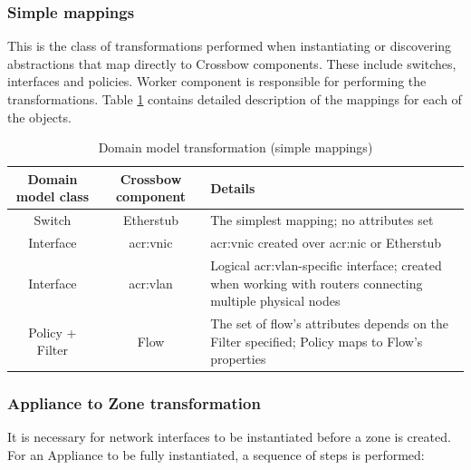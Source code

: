 \documentclass[11pt]{book}
\begin{document}
        \subsubsection{Simple mappings}

          This is the class of transformations performed when instantiating or discovering abstractions that map
          directly to Crossbow components. These include switches, interfaces and policies. Worker component is
          responsible for performing the transformations. Table \ref{tab:impl:simple-mapping} contains detailed
          description of the mappings for each of the objects.

          \begin{table}[H]
            \centering

            \begin{tabularx}{\textwidth}{|c|c|X|}
              \hline
              Domain model class & Crossbow component & \centering Details \tabularnewline
              \hline \hline
              Switch             & Etherstub          & The simplest mapping; no attributes set \\
              \hline
              Interface          & \gls{acr:vnic}     & \gls{acr:vnic} created over \gls{acr:nic} or Etherstub \\
              \hline
              Interface          & \gls{acr:vlan}     & Logical \gls{acr:vlan}-specific interface; created when working
                                                        with routers connecting multiple physical nodes \\
              \hline
              Policy + Filter    & Flow               & The set of flow's attributes depends on the Filter specified;
                                                        Policy maps to Flow's properties \\
              \hline
            \end{tabularx}

            \caption{Domain model transformation (simple mappings)}
            \label{tab:impl:simple-mapping}
          \end{table}


        \subsubsection{Appliance to Zone transformation}

          It is necessary for network interfaces to be instantiated before a zone is created. For an Appliance to be
          fully instantiated, a sequence of steps is performed:
\end{document}
